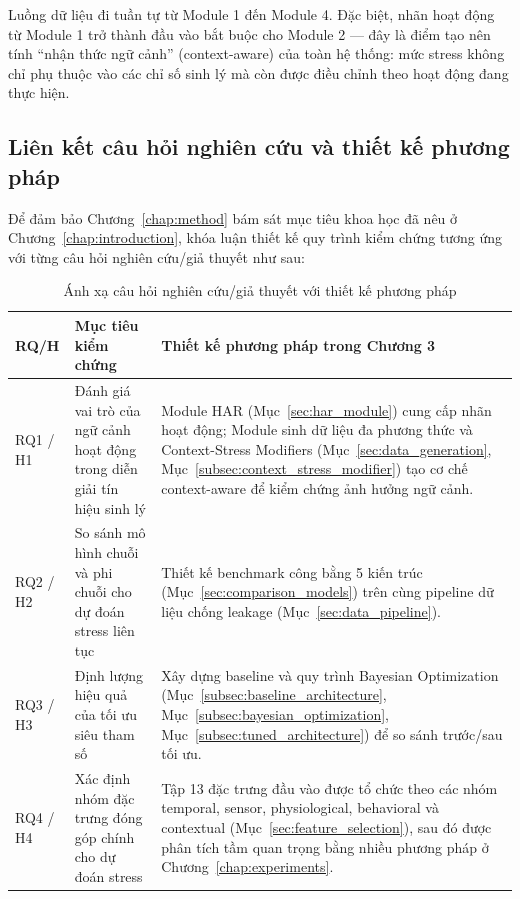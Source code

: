 Luồng dữ liệu đi tuần tự từ Module 1 đến Module 4. Đặc biệt, nhãn hoạt động từ Module 1 trở thành đầu vào bắt buộc cho Module 2 — đây là điểm tạo nên tính ``nhận thức ngữ cảnh'' (context-aware) của toàn hệ thống: mức stress không chỉ phụ thuộc vào các chỉ số sinh lý mà còn được điều chỉnh theo hoạt động đang thực hiện.

\subsection{Liên kết câu hỏi nghiên cứu và thiết kế phương pháp}
\label{subsec:rq_method_mapping}

Để đảm bảo Chương~\ref{chap:method} bám sát mục tiêu khoa học đã nêu ở Chương~\ref{chap:introduction}, khóa luận thiết kế quy trình kiểm chứng tương ứng với từng câu hỏi nghiên cứu/giả thuyết như sau:

\begin{table}[H]
\centering
\caption{Ánh xạ câu hỏi nghiên cứu/giả thuyết với thiết kế phương pháp}
\label{tab:rq_method_mapping}
\small
\begin{tabular}{|p{2.0cm}|p{5.0cm}|p{6.5cm}|}
\hline
\textbf{RQ/H} & \textbf{Mục tiêu kiểm chứng} & \textbf{Thiết kế phương pháp trong Chương 3} \\
\hline
RQ1 / H1 & Đánh giá vai trò của ngữ cảnh hoạt động trong diễn giải tín hiệu sinh lý & Module HAR (Mục~\ref{sec:har_module}) cung cấp nhãn hoạt động; Module sinh dữ liệu đa phương thức và Context-Stress Modifiers (Mục~\ref{sec:data_generation}, Mục~\ref{subsec:context_stress_modifier}) tạo cơ chế context-aware để kiểm chứng ảnh hưởng ngữ cảnh. \\
\hline
RQ2 / H2 & So sánh mô hình chuỗi và phi chuỗi cho dự đoán stress liên tục & Thiết kế benchmark công bằng 5 kiến trúc (Mục~\ref{sec:comparison_models}) trên cùng pipeline dữ liệu chống leakage (Mục~\ref{sec:data_pipeline}). \\
\hline
RQ3 / H3 & Định lượng hiệu quả của tối ưu siêu tham số & Xây dựng baseline và quy trình Bayesian Optimization (Mục~\ref{subsec:baseline_architecture}, Mục~\ref{subsec:bayesian_optimization}, Mục~\ref{subsec:tuned_architecture}) để so sánh trước/sau tối ưu. \\
\hline
RQ4 / H4 & Xác định nhóm đặc trưng đóng góp chính cho dự đoán stress & Tập 13 đặc trưng đầu vào được tổ chức theo các nhóm temporal, sensor, physiological, behavioral và contextual (Mục~\ref{sec:feature_selection}), sau đó được phân tích tầm quan trọng bằng nhiều phương pháp ở Chương~\ref{chap:experiments}. \\
\hline
\end{tabular}
\end{table}

